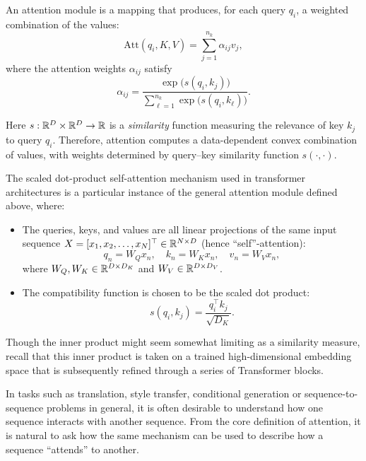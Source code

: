 An attention module is a mapping that produces, for each query $q_i$, a weighted combination of the values:
\[
\mathrm{Att}(q_i, K, V)
=
\sum_{j=1}^{n_k} \alpha_{ij} v_j,
\]
where the attention weights $\alpha_{ij}$ satisfy
\[
\alpha_{ij}
=
\frac{\exp\big(s(q_i,k_j)\big)}
{\sum_{\ell=1}^{n_k} \exp\big(s(q_i,k_\ell)\big)}.
\]

Here $s : {\mathbb R}^D \times {\mathbb R}^D \to {\mathbb R}$ is a \emph{similarity} function measuring the relevance of key $k_j$ to query $q_i$. Therefore, attention computes a data-dependent convex combination of values, with weights determined by query–key similarity function $s(\cdot,\cdot)$.


\begin{remark}
The scaled dot-product self-attention mechanism used in
transformer architectures is a particular instance of the
general attention module defined above, where:
\begin{itemize}
    \item The queries, keys, and values are all linear projections
    of the same input sequence $X = [x_1, x_2, \dots, x_N]^\top \in {\mathbb R}^{N\times D}$
    (hence ``self''-attention):
    \[
    q_n = W_Q x_n, \quad
    k_n = W_K x_n, \quad
    v_n = W_V x_n,
    \]
    where $W_Q, W_K \in {\mathbb R}^{D \times D_K}$
    and $W_V \in {\mathbb R}^{D \times D_V}$.
    
    \item The compatibility function is chosen to be the
    scaled dot product:
    \[
    s(q_i,k_j)
    =
    \frac{q_i^\top k_j}{\sqrt{D_K}}.
    \]
\end{itemize}
\end{remark}

\begin{remark}
    Though the inner product might seem somewhat limiting as a similarity measure, recall that this inner product is taken on a trained high-dimensional embedding space that is subsequently refined through a series of Transformer blocks. 
\end{remark}

In tasks such as translation, style transfer, conditional generation or sequence-to-sequence problems in general, it is often desirable to understand how one sequence  interacts with another sequence. From the core definition of attention, it is natural to ask how the same mechanism can be used to describe how a sequence “attends” to another.



